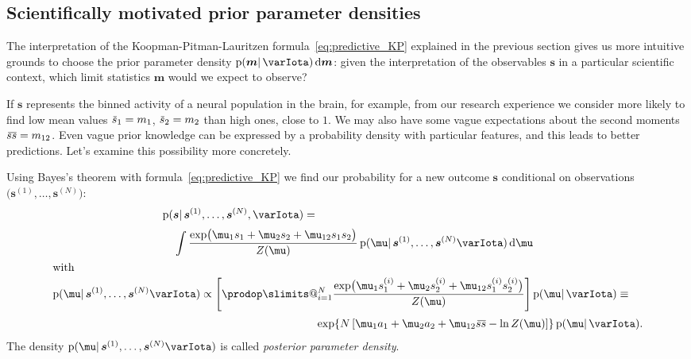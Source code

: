 \documentclass[\ifafour a4paper,12pt,\else a5paper,10pt,\fi%
onecolumn,oneside,article,%
british%
]{memoir}
\makeatletter
\theoremstyle{remark}
\theoremstyle{innote}
\def\prod{\DOTSI\prodop\slimits@}
\newcommand*{\di}{\mathrm{d}}%
\newcommand*{\pf}{\mathrm{p}}%
\renewcommand*{\|}{\mathpunct{|}}
\newcommand*{\widebar}[1]{{\mkern1.5mu\skew{2}\overline{\mkern-1.5mu#1\mkern-1.5mu}\mkern 1.5mu}}
\newcommand*{\yI}{\varIota}
\newcommand*{\ys}{\bm{s}}
\newcommand*{\yso}[1]{\ys^{(#1)}}
\newcommand*{\ysso}[1]{s^{(#1)}}
\newcommand*{\la}{\mu_{12}}
\newcommand*{\yth}{\bm{\mu}}
\newcommand*{\yt}{\bm{m}}
\newcommand*{\yl}{m_{12}}
\newcommand*{\yavv}{\widebar{s}}
\newcommand*{\ycv}{\widebar{ss}}
\makeatother
\begin{document}
\subsection{Scientifically motivated prior parameter densities}
\label{sec:other_priors}

The interpretation of the Koopman-Pitman-Lauritzen
formula~\eqref{eq:predictive_KP} explained in the previous section gives us
more intuitive grounds to choose the prior parameter density
$\pf(\yt \|\yI)\,\di\yt$: given the interpretation of the observables $\ys$
in a particular scientific context, which limit statistics $\yt$ would we
expect to observe?

If $\ys$ represents the binned activity of a neural population in the
brain, for example, from our research experience we consider more likely to
find low mean values $\yavv_1=m_1$, $\yavv_2=m_2$ than high ones, close to
$1$. We may also have some vague expectations about the second moments
$\ycv=\yl$. Even vague prior knowledge can be expressed by a probability
density with particular features, and this leads to better predictions.
Let's examine this possibility more concretely.

\bigskip


Using Bayes's theorem with formula~\eqref{eq:predictive_KP} we find our
probability for a new outcome $\ys$ conditional on observations
$\bigl( \yso{1}, \dotsc,\yso{N} \bigr)$:
\begin{subequations}    \label{eq:conditional_prediction}
  \begin{gather}
    \begin{multlined}[][0.9\linewidth]
      \pf(\ys \| \yso{1}, \dotsc, \yso{N}, \yI ) ={}\\[\jot]
      \int
      \frac{  \exp\bigl(
        \mu_1 s_1 + \mu_2 s_2 + \la s_1 s_2
        \bigr) }{Z(\yth)}
      \,
      \pf(\yth \| \yso{1},\dotsc,\yso{N} \yI) \, \di\yth
    \end{multlined}
    \\
    \shortintertext{with}
    \begin{multlined}[0.95\linewidth]
    \pf(\yth \| \yso{1},\dotsc,\yso{N} \yI)
    \propto
    \Biggl[  \prod_{i=1}^{N}
    \frac{  \exp\bigl(
      \mu_1 \ysso{i}_1 + \mu_2 \ysso{i}_2 + \la \ysso{i}_1 \ysso{i}_2
      \bigr) }{Z(\yth)}
    \Biggr]\,
    \pf(\yth \| \yI) 
\equiv{}\\[\jot]
     \exp\{N\,[
      \mu_1 a_1 + \mu_2 a_2 + \la \ycv -\ln Z(\yth)]\}\,
    \pf(\yth \| \yI).
  \end{multlined}
      \label{eq:posterior_density}
  \end{gather}
\end{subequations}
The density $\pf(\yth \| \yso{1},\dotsc,\yso{N} \yI)$ is called
\emph{posterior parameter density}.
\end{document}
